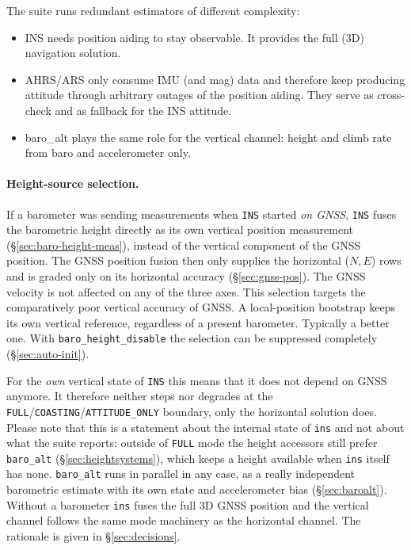 \documentclass[11pt,a4paper]{article}
\newcommand{\code}[1]{\texttt{#1}}
\begin{document}
The suite runs redundant estimators of different complexity:

\begin{itemize}
  \item INS needs position aiding to stay observable. It provides the full (3D)
        navigation solution.
  \item AHRS/ARS only consume IMU (and mag) data and therefore keep producing
        attitude through arbitrary outages of the position aiding. They serve
        as cross-check and as fallback for the INS attitude.
  \item baro\_alt plays the same role for the vertical channel: height and
        climb rate from baro and accelerometer only.
\end{itemize}

\paragraph{Height-source selection.} If a barometer was sending measurements
when \code{INS} started \emph{on GNSS}, \code{INS} fuses the barometric height
directly as its own vertical position measurement
(\S\ref{sec:baro-height-meas}), instead of the vertical component of the GNSS
position. The GNSS position fusion then only supplies the horizontal ($N,E$)
rows and is graded only on its horizontal accuracy (\S\ref{sec:gnss-pos}). The
GNSS velocity is not affected on any of the three axes. This selection targets
the comparatively poor vertical accuracy of GNSS. A local-position bootstrap
keeps its own vertical reference, regardless of a
present barometer. Typically a better one. With \code{baro\_\allowbreak{}height\_\allowbreak{}disable}
the selection can be suppressed completely (\S\ref{sec:auto-init}).

For the \emph{own} vertical state of \code{INS} this means that it does not
depend on GNSS anymore. It therefore neither steps nor degrades at the
\code{FULL}/\code{COASTING}/\code{ATTITUDE\_\allowbreak{}ONLY} boundary, only
the horizontal solution does. Please note that this is a statement about the
internal state of \code{ins} and not about what the suite reports: outside of
\code{FULL} mode the height accessors still prefer
\code{baro\_\allowbreak{}alt} (\S\ref{sec:heightsystems}), which keeps a height
available when \code{ins} itself has none. \code{baro\_\allowbreak{}alt} runs in
parallel in any case, as a really independent barometric estimate with its own
state and accelerometer bias (\S\ref{sec:baroalt}). Without a barometer
\code{ins} fuses the full 3D GNSS position and the vertical channel follows the
same mode machinery as the horizontal channel. The rationale is given in
\S\ref{sec:decisions}.
\end{document}
